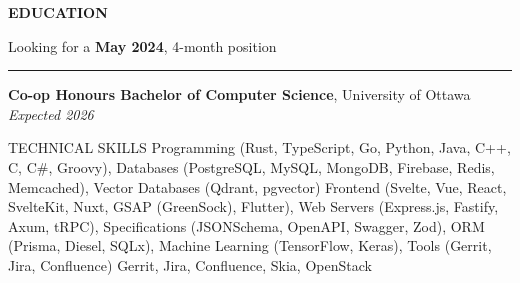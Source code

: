 \documentclass{resume}
\begin{document}
\color{primary}

\vspace{-8pt}

\sectionskip
\MakeUppercase{{\bf Education}}
\vspace{-21pt}
\begin{flushright}
	{Looking for a \textbf{May 2024}, 4-month position}
\end{flushright}
\sectionlineskip
\hrule %
\begin{list}{}{ %
		\setlength{\leftmargin}{0em} %
	}
	\item[] \textbf{Co-op Honours Bachelor of Computer Science}, University of Ottawa \hfill \textit{Expected 2026}
\end{list}

\vspace{-6pt}

\begin{rSection}{TECHNICAL SKILLS}
	Programming (Rust, TypeScript, Go, Python, Java, C++, C, C\#, Groovy),
	Databases (PostgreSQL, MySQL, MongoDB, Firebase, Redis, Memcached),
	Vector Databases (Qdrant, pgvector)
	Frontend (Svelte, Vue, React, SvelteKit, Nuxt, GSAP (GreenSock), Flutter),
	Web Servers (Express.js, Fastify, Axum, tRPC),
	Specifications (JSONSchema, OpenAPI, Swagger, Zod),
	ORM (Prisma, Diesel, SQLx),
	Machine Learning (TensorFlow, Keras),
	Tools (Gerrit, Jira, Confluence)
	Gerrit, Jira, Confluence,
	Skia, OpenStack
\end{rSection}

\vspace{-8pt}
\end{document}
